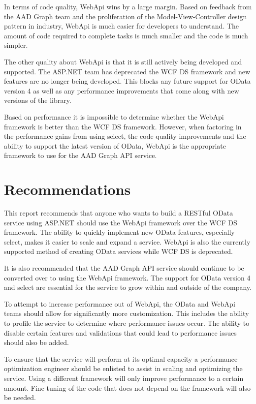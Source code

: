 \documentclass[se]{uw-wkrpt}
\begin{document}
In terms of code quality, WebApi wins by a large margin. Based on feedback from the AAD Graph team and the proliferation of the Model-View-Controller design pattern in industry, WebApi is much easier for developers to understand. The amount of code required to complete tasks is much smaller and the code is much simpler.

The other quality about WebApi is that it is still actively being developed and supported. The ASP.NET team has deprecated the WCF DS framework and new features are no longer being developed. This blocks any future support for OData version 4 as well as any performance improvements that come along with new versions of the library.

Based on performance it is impossible to determine whether the WebApi framework is better than the WCF DS framework. However, when factoring in the performance gains from using select, the code quality improvements and the ability to support the latest version of OData, WebApi is the appropriate framework to use for the AAD Graph API service.

\section{Recommendations}

This report recommends that anyone who wants to build a RESTful OData service using ASP.NET should use the WebApi framework over the WCF DS framework. The ability to quickly implement new OData features, especially select, makes it easier to scale and expand a service. WebApi is also the currently supported method of creating OData services while WCF DS is deprecated.

It is also recommended that the AAD Graph API service should continue to be converted over to using the WebApi framework. The support for OData version 4 and select are essential for the service to grow within and outside of the company.

To attempt to increase performance out of WebApi, the OData and WebApi teams should allow for significantly more customization. This includes the ability to profile the service to determine where performance issues occur. The ability to disable certain features and validations that could lead to performance issues should also be added.

To ensure that the service will perform at its optimal capacity a performance optimization engineer should be enlisted to assist in scaling and optimizing the service. Using a different framework will only improve performance to a certain amount. Fine-tuning of the code that does not depend on the framework will also be needed.
\end{document}
